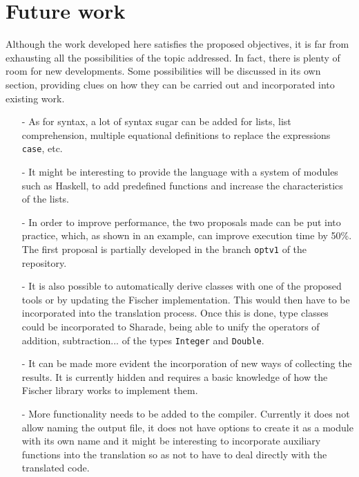 \documentclass[class=article, crop=false]{standalone}
\begin{document}
\section{Future work}
Although the work developed here satisfies the proposed objectives, it is far from exhausting
all the possibilities of the topic addressed. In fact, there is plenty of room for new
developments. Some possibilities will be discussed in its own section, providing clues on how
they can be carried out and incorporated into existing work. 

\begin{itemize}
  \item[-] As for syntax, a lot of syntax sugar can be added for lists, list comprehension,
  multiple equational definitions to replace the expressions \verb`case`, etc.

  \item[-] It might be interesting to provide the language with a system of modules such as
  Haskell, to add predefined functions and increase the characteristics of the lists.

  \item[-] In order to improve performance, the two proposals made can be put into practice,
  which, as shown in an example, can improve execution time by 50\%. The first proposal is
  partially developed in the branch \verb`optv1` of the repository.

  \item[-] It is also possible to automatically derive classes with one of the proposed tools
  or by updating the Fischer implementation. This would then have to be incorporated into the
  translation process. Once this is done, type classes could be incorporated to Sharade,
  being able to unify the operators of addition, subtraction... of the types \verb`Integer`
  and \verb`Double`.

  \item[-] It can be made more evident the incorporation of new ways of collecting the
  results. It is currently hidden and requires a basic knowledge of how the Fischer library
  works to implement them.

  \item[-] More functionality needs to be added to the compiler. Currently it does not allow
  naming the output file, it does not have options to create it as a module with its own name
  and it might be interesting to incorporate auxiliary functions into the translation so as
  not to have to deal directly with the translated code.
\end{itemize}
\end{document}
